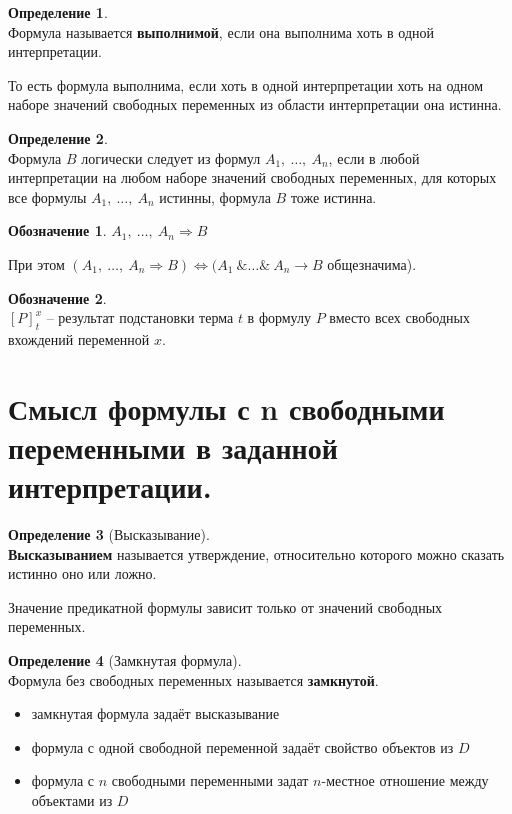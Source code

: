 \documentclass[a4paper,12pt]{article}
\theoremstyle{definition} %
\newtheorem{definition}{Определение}[section]
\newtheorem{notation}{Обозначение}[subsection]
\theoremstyle{definition} %
\theoremstyle{remark} %
\begin{document}
	\begin{definition}\ \\[1ex]
		Формула называется \textbf{выполнимой}, если она выполнима хоть в одной интерпретации.
	\end{definition}

	То есть формула выполнима, если хоть в одной интерпретации хоть на одном наборе значений свободных переменных из области интерпретации она истинна.
	
	\begin{definition}\ \\[1ex]
		Формула $B$ логически следует из формул $A_1, \ \dots , \ A_n$, если в любой интерпретации на любом наборе значений свободных переменных, для которых все формулы $A_1, \ \dots , \ A_n$ истинны, формула $B$ тоже истинна.
	\end{definition}

	\begin{notation}
		$A_1, \ \dots , \ A_n \Rightarrow B$
	\end{notation}
	При этом $(A_1, \ \dots , \ A_n \Rightarrow B) \Leftrightarrow (A_1 \ \& \dots \& \ A_n \rightarrow B$ общезначима).
	
	\begin{notation}\ \\[1ex]
		$[P]_{t}^{x}$ -- результат подстановки терма $t$ в формулу $P$ вместо всех свободных вхождений переменной $x$.
	\end{notation}

\section{Смысл формулы с n свободными переменными в заданной интерпретации.}
	\begin{definition}[Высказывание]\ \\[1ex]
		\textbf{Высказыванием} называется утверждение, относительно которого можно сказать истинно оно или ложно.
	\end{definition}

	Значение предикатной формулы зависит только от значений свободных переменных.
	
	\begin{definition}[Замкнутая формула]\ \\[1ex]
		Формула без свободных переменных называется \textbf{замкнутой}.
	\end{definition}
	
	\begin{itemize}
		\item замкнутая формула задаёт высказывание
		\item формула с одной свободной переменной задаёт свойство объектов из $D$
		\item формула с $n$ свободными переменными задат $n$-местное отношение между объектами из $D$
	\end{itemize}
	
\end{document}
